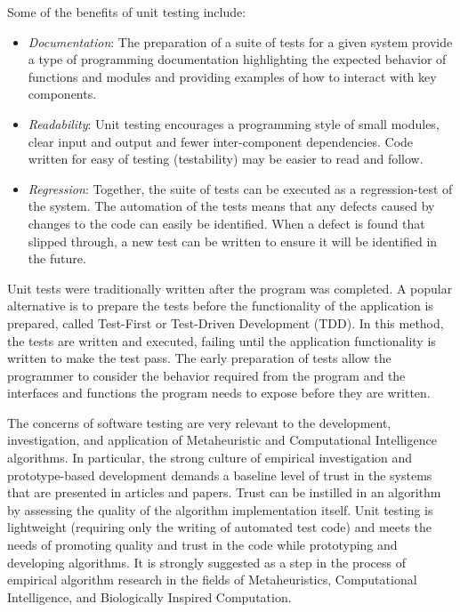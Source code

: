 Some of the benefits of unit testing include:

\begin{itemize}
  \item \emph{Documentation}: The preparation of a suite of tests for a given system provide a type of programming documentation highlighting the expected behavior of functions and modules and providing examples of how to interact with key components.
  \item \emph{Readability}: Unit testing encourages a programming style of small modules, clear input and output and fewer inter-component dependencies. Code written for easy of testing (testability) may be easier to read and follow.
  \item \emph{Regression}: Together, the suite of tests can be executed as a regression-test of the system. The automation of the tests means that any defects caused by changes to the code can easily be identified. When a defect is found that slipped through, a new test can be written to ensure it will be identified in the future.
\end{itemize}

Unit tests were traditionally written after the program was completed. A popular alternative is to prepare the tests before the functionality of the application is prepared, called Test-First or Test-Driven Development (TDD). In this method, the tests are written and executed, failing until the application functionality is written to make the test pass. The early preparation of tests allow the programmer to consider the behavior required from the program and the interfaces and functions the program needs to expose before they are written. 

The concerns of software testing are very relevant to the development, investigation, and application of Metaheuristic and Computational Intelligence algorithms. In particular, the strong culture of empirical investigation and prototype-based development demands a baseline level of trust in the systems that are presented in articles and papers. Trust can be instilled in an algorithm by assessing the quality of the algorithm implementation itself. 
Unit testing is lightweight (requiring only the writing of automated test code) and meets the needs of promoting quality and trust in the code while prototyping and developing algorithms. It is strongly suggested as a step in the process of empirical algorithm research in the fields of Metaheuristics, Computational Intelligence, and Biologically Inspired Computation.

